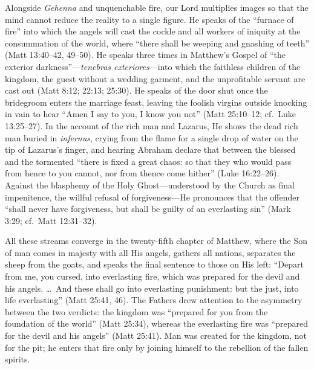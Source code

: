 Alongside \textit{Gehenna} and unquenchable fire, our Lord multiplies images so that the mind cannot reduce the reality to a single figure. He speaks of the ``furnace of fire'' into which the angels will cast the cockle and all workers of iniquity at the consummation of the world, where ``there shall be weeping and gnashing of teeth'' (Matt 13:40--42, 49--50). He speaks three times in Matthew's Gospel of ``the exterior darkness''---\textit{tenebras exteriores}---into which the faithless children of the kingdom, the guest without a wedding garment, and the unprofitable servant are cast out (Matt 8:12; 22:13; 25:30). He speaks of the door shut once the bridegroom enters the marriage feast, leaving the foolish virgins outside knocking in vain to hear ``Amen I say to you, I know you not'' (Matt 25:10--12; cf.\ Luke 13:25--27). In the account of the rich man and Lazarus, He shows the dead rich man buried in \textit{infernus}, crying from the flame for a single drop of water on the tip of Lazarus's finger, and hearing Abraham declare that between the blessed and the tormented ``there is fixed a great chaos: so that they who would pass from hence to you cannot, nor from thence come hither'' (Luke 16:22--26). Against the blasphemy of the Holy Ghost---understood by the Church as final impenitence, the willful refusal of forgiveness---He pronounces that the offender ``shall never have forgiveness, but shall be guilty of an everlasting sin'' (Mark 3:29; cf.\ Matt 12:31--32).

All these streams converge in the twenty-fifth chapter of Matthew, where the Son of man comes in majesty with all His angels, gathers all nations, separates the sheep from the goats, and speaks the final sentence to those on His left: ``Depart from me, you cursed, into everlasting fire, which was prepared for the devil and his angels. \dots\ And these shall go into everlasting punishment: but the just, into life everlasting'' (Matt 25:41, 46). The Fathers drew attention to the asymmetry between the two verdicts: the kingdom was ``prepared for you from the foundation of the world'' (Matt 25:34), whereas the everlasting fire was ``prepared for the devil and his angels'' (Matt 25:41). Man was created for the kingdom, not for the pit; he enters that fire only by joining himself to the rebellion of the fallen spirits.

